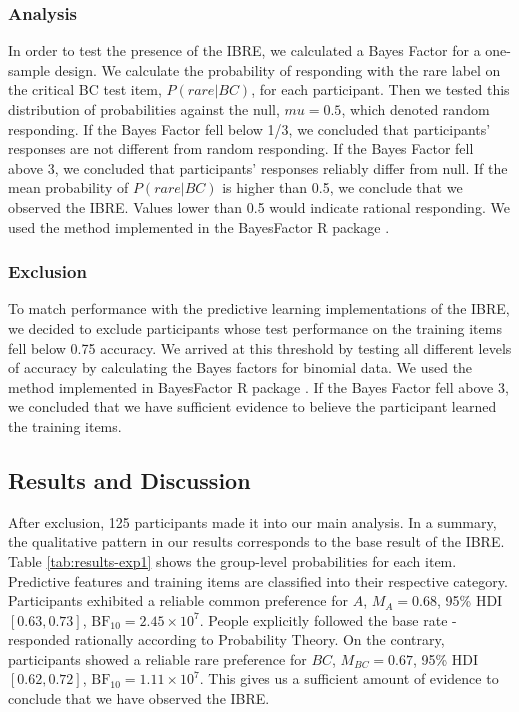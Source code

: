 \documentclass[10pt,letterpaper]{article}
\begin{document}
\subsubsection*{Analysis}

In order to test the presence of the IBRE, we calculated a Bayes Factor for a one-sample design.
We calculate the probability of responding with the rare label on the critical BC test item, $P(rare|BC)$, for each participant.
Then we tested this distribution of probabilities against the null, $mu = 0.5$, which denoted random responding.
If the Bayes Factor fell below 1/3, we concluded that participants' responses are not different from random responding.
If the Bayes Factor fell above 3, we concluded that participants' responses reliably differ from null.
If the mean probability of $P(rare|BC)$ is higher than 0.5, we conclude that we observed the IBRE.
Values lower than 0.5 would indicate rational responding.
We used the method implemented in the BayesFactor R package \cite{morey2022bayes}.

\subsubsection*{Exclusion}

To match performance with the predictive learning implementations of the IBRE, we decided to exclude participants whose test performance on the training items fell below 0.75 accuracy.
We arrived at this threshold by testing all different levels of accuracy by calculating the Bayes factors for binomial data.
We used the method implemented in BayesFactor R package \cite{morey2022bayes}.
If the Bayes Factor fell above 3, we concluded that we have sufficient evidence to believe the participant learned the training items.

\subsection{Results and Discussion}

After exclusion, 125 participants made it into our main analysis.
In a summary, the qualitative pattern in our results corresponds to the base result of the IBRE.
Table \ref*{tab:results-exp1} shows the group-level probabilities for each item.
Predictive features and training items are classified into their respective category.
Participants exhibited a reliable common preference for $A$, $M_{A} = 0.68$, 95\% HDI $[0.63, 0.73]$, $\mathrm{BF}_{10} = 2.45 \times 10^{7}$.
People explicitly followed the base rate  - responded rationally according to Probability Theory.
On the contrary, participants showed a reliable rare preference for $BC$, $M_{BC} = 0.67$, 95\% HDI $[0.62, 0.72]$, $\mathrm{BF}_{10} = 1.11 \times 10^{7}$.
This gives us a sufficient amount of evidence to conclude that we have observed the IBRE.
\end{document}

